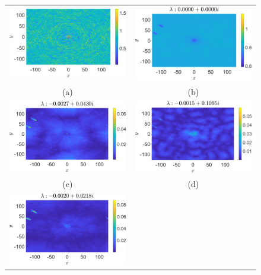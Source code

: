\documentclass[aps,prl,preprint,groupedaddress]{revtex4-1}
\begin{document}
\begin{figure}[!ht]
\centering
\begin{tabular}{cc}
\includegraphics[width=.525\textwidth]{amplitude_hfforce_K_256_Lx_128_tf_2e4} &\hspace{-15pt} \includegraphics[width=.51\textwidth]{mean_hfforce_K_256_Lx_128_tf_2e4} \\
(a) & (b)\\
\includegraphics[width=.525\textwidth]{osc1_hfforce_K_256_Lx_128_tf_2e4} &\hspace{-15pt} \includegraphics[width=.51\textwidth]{osc2_hfforce_K_256_Lx_128_tf_2e4} \\
(c) & (d)\\
\includegraphics[width=.525\textwidth]{osc3_hfforce_K_256_Lx_128_tf_2e4} & \\

\end{tabular}
\end{figure}
\end{document}

